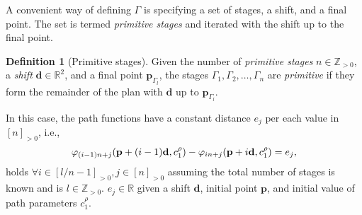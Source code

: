 \documentclass[letterpaper,10pt,conference,twoside]{IEEEtran}
\theoremstyle{definition}
\newtheorem{defn}{Definition}[section]
\begin{document}
A convenient way of defining $\Gamma$ is specifying a set of stages, a shift, and a final point. The set is termed \emph{primitive stages} and iterated with the shift up to %
the final point.

\begin{defn}[Primitive stages]
  \label{def:primitive}
  Given the number of \emph{primitive stages} $n\in\mathbb{Z}_{>0}$, a \emph{shift} $\mathbf{d}\in\mathbb{R}^2$, and a final point $\mathbf{p}_{\Gamma_l}$, the stages $\Gamma_1,\Gamma_2,\dots,\Gamma_n$ %
  are \emph{primitive} if they form the remainder of the plan with $\mathbf{d}$ up to $\mathbf{p}_{\Gamma_l}$. 
\end{defn}
\noindent In this case, the path functions have a constant distance $e_j$ per each value in $[n]_{>0}$, i.e., 
\begin{equation}\small\label{eq:primitive}
  \varphi_{(i-1)n+j}(\mathbf{p}+(i-1)\mathbf{d},c_1^\rho)-\varphi_{in+j}(\mathbf{p}+i\mathbf{d},c_1^\rho)=e_j,
\end{equation}
holds $\forall i\in[l/n-1]_{>0},j\in[n]_{>0}$ assuming the total number of stages is known and is $l\in\mathbb{Z}_{>0}$. $e_j\in\mathbb{R}$ given a shift $\mathbf{d}$, initial point $\mathbf{p}$, and initial value of path parameters $c_1^\rho$.
\end{document}
